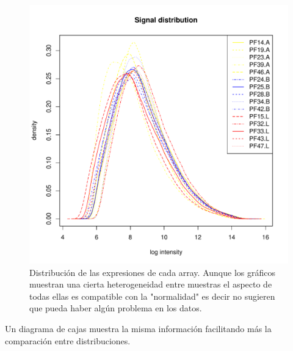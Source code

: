 \documentclass[a4paper]{article}\usepackage[]{graphicx}\usepackage[]{color}
\makeatletter
\def\maxwidth{ %
  \ifdim\Gin@nat@width>\linewidth
    \linewidth
  \else
    \Gin@nat@width
  \fi
}
\newenvironment{knitrout}{}{} %
\makeatother
\begin{document}
\begin{figure}[htbp]
\begin{knitrout}
\color{fgcolor}
\includegraphics[width=\maxwidth]{images/graficplotHist-1} 

\end{knitrout}
\caption{Distribución de las expresiones de cada array. Aunque los gráficos muestran una cierta heterogeneidad entre muestras el aspecto de todas ellas es compatible con la "normalidad" es decir no sugieren que pueda haber algún problema en los datos.}
\end{figure}

Un diagrama de cajas muestra la misma información facilitando más la comparaci\'on entre distribuciones.
  
\end{document}
